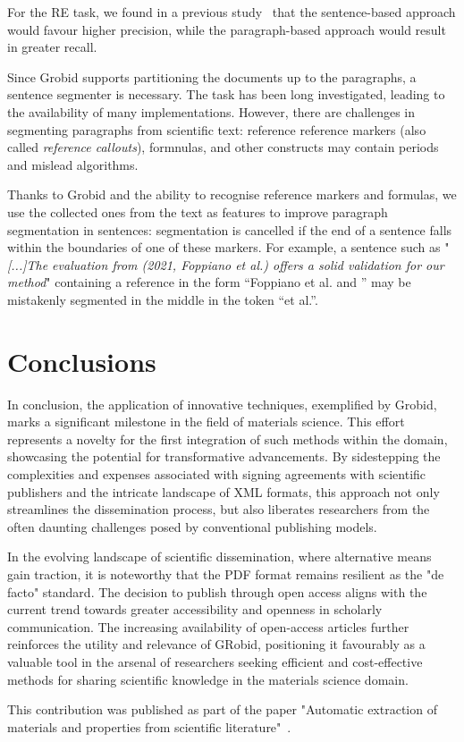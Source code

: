 For the RE task, we found in a previous study~\cite{foppiano2019proposal} that the sentence-based approach would favour higher precision, while the paragraph-based approach would result in greater recall.

Since Grobid supports partitioning the documents up to the paragraphs, a sentence segmenter is necessary. The task has been long investigated, leading to the availability of many implementations. 
However, there are challenges in segmenting paragraphs from scientific text: reference reference markers (also called \textit{reference callouts}), formnulas, and other constructs may contain periods and mislead algorithms. 

Thanks to Grobid and the ability to recognise reference markers and formulas, we use the collected ones from the text as features to improve paragraph segmentation in sentences: segmentation is cancelled if the end of a sentence falls within the boundaries of one of these markers.
For example, a sentence such as "\textit{[...]The evaluation from (2021, Foppiano et al.) 
 offers a solid validation for our method}" containing a reference in the form ``Foppiano et al. and '' may be mistakenly segmented in the middle in the token ``et al.''. 

\section{Conclusions}

In conclusion, the application of innovative techniques, exemplified by Grobid, marks a significant milestone in the field of materials science. This effort represents a novelty for the first integration of such methods within the domain, showcasing the potential for transformative advancements. 
By sidestepping the complexities and expenses associated with signing agreements with scientific publishers and the intricate landscape of XML formats, this approach not only streamlines the dissemination process, but also liberates researchers from the often daunting challenges posed by conventional publishing models.

In the evolving landscape of scientific dissemination, where alternative means gain traction, it is noteworthy that the PDF format remains resilient as the "de facto" standard. The decision to publish through open access aligns with the current trend towards greater accessibility and openness in scholarly communication. 
The increasing availability of open-access articles further reinforces the utility and relevance of GRobid, positioning it favourably as a valuable tool in the arsenal of researchers seeking efficient and cost-effective methods for sharing scientific knowledge in the materials science domain.

This contribution was published as part of the paper "Automatic extraction of materials and properties from scientific literature"~\cite{foppiano2023automatic}.